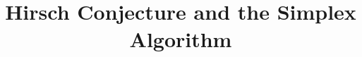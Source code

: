 \documentclass[11pt,a4paper]{article}
\theoremstyle{definition}
\begin{document}
\title{\sc Hirsch Conjecture and the Simplex Algorithm}
\date{}
\maketitle
\end{document}
